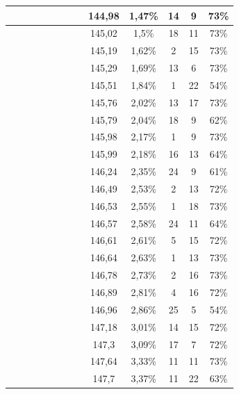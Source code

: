 \begin{center}
\begin{longtable}{|c|c|c|c|c|c|c|c|c|c|c|c|c|}
 \x &  &  \x &  \x &  \x &  \x &  \x &  \x & 144,98 & 1,47\% & 14 & 9 & 73\% \\ \hline
 \x &  &  \x &  \x &  &  \x &  \x &  \x & 145,02 & 1,5\% & 18 & 11 & 73\% \\ \hline
 \x &  \x &  \x &  \x &  &  \x &  \x &  \x & 145,19 & 1,62\% & 2 & 15 & 73\% \\ \hline
 \x &  &  &  \x &  &  \x &  \x &  \x & 145,29 & 1,69\% & 13 & 6 & 73\% \\ \hline
 \x &  \x &  &  &  &  &  &  \x & 145,51 & 1,84\% & 1 & 22 & 54\% \\ \hline
 \x &  &  \x &  &  \x &  \x &  &  \x & 145,76 & 2,02\% & 13 & 17 & 73\% \\ \hline
 \x &  \x &  \x &  &  \x &  &  &  \x & 145,79 & 2,04\% & 18 & 9 & 62\% \\ \hline
 \x &  \x &  \x &  &  \x &  \x &  \x &  \x & 145,98 & 2,17\% & 1 & 9 & 73\% \\ \hline
 \x &  &  \x &  &  &  &  &  \x & 145,99 & 2,18\% & 16 & 13 & 64\% \\ \hline
 \x &  &  &  &  \x &  &  &  \x & 146,24 & 2,35\% & 24 & 9 & 61\% \\ \hline
 \x &  \x &  \x &  &  \x &  \x &  &  \x & 146,49 & 2,53\% & 2 & 13 & 72\% \\ \hline
 \x &  &  \x &  &  &  \x &  &  \x & 146,53 & 2,55\% & 1 & 18 & 73\% \\ \hline
 \x &  \x &  \x &  &  &  &  &  \x & 146,57 & 2,58\% & 24 & 11 & 64\% \\ \hline
 \x &  \x &  \x &  &  \x &  \x &  \x &  \x & 146,61 & 2,61\% & 5 & 15 & 72\% \\ \hline
 \x &  \x &  &  \x &  \x &  \x &  \x &  \x & 146,64 & 2,63\% & 1 & 13 & 73\% \\ \hline
 \x &  \x &  \x &  \x &  \x &  \x &  \x &  \x & 146,78 & 2,73\% & 2 & 16 & 73\% \\ \hline
 \x &  \x &  \x &  \x &  \x &  \x &  \x &  \x & 146,89 & 2,81\% & 4 & 16 & 72\% \\ \hline
 \x &  \x &  &  &  &  &  &  \x & 146,96 & 2,86\% & 25 & 5 & 54\% \\ \hline
 \x &  \x &  \x &  &  &  \x &  &  \x & 147,18 & 3,01\% & 14 & 15 & 72\% \\ \hline
 \x &  &  \x &  \x &  &  \x &  &  \x & 147,3 & 3,09\% & 17 & 7 & 72\% \\ \hline
 \x &  &  &  &  &  \x &  \x &  \x & 147,64 & 3,33\% & 11 & 11 & 73\% \\ \hline
 \x &  &  \x &  &  &  &  &  \x & 147,7 & 3,37\% & 11 & 22 & 63\% \\ \hline

\end{longtable}
\end{center}
